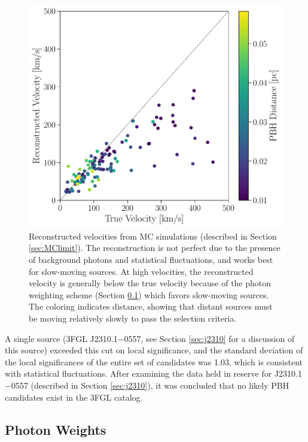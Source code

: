 \begin{figure}
\begin{center}
\includegraphics[width=0.9\columnwidth]{figures/reconstructedVelocity.pdf}
\caption{
\label{fig:reconstruction}
Reconstructed velocities from MC simulations (described in Section \ref{sec:MClimit}). The reconstruction is not perfect due to the presence of background photons and statistical fluctuations, and works best for slow-moving sources. At high velocities, the reconstructed velocity is generally below the true velocity because of the photon weighting scheme (Section \ref{sec:likelihood}) which favors slow-moving sources. The coloring indicates distance, showing that distant sources must be moving relatively slowly to pass the selection criteria.
}
\end{center}
\end{figure}

A single source (3FGL J2310.1$-$0557, see Section \ref{sec:j2310} for a discussion of this source) exceeded this cut on local significance, and the standard deviation of the local significances of the entire set of candidates was 1.03, which is consistent with statistical fluctuations.
After examining the data held in reserve for J2310.1$-$0557 (described in Section \ref{sec:j2310}), it was concluded that no likely PBH candidates exist in the 3FGL catalog.

\subsection{Photon Weights}
\label{sec:likelihood}

